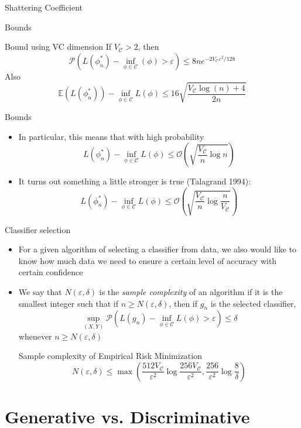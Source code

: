 \documentclass{beamer}
\renewcommand{\Pr}[1]{\mathcal{P} \left( #1 \right)}
\newcommand{\cls}{\mathcal{C}}
\newcommand{\E}[1]{\mathbb{E}\left( #1 \right)}
\newcommand{\pa}[1]{\left( #1 \right)}
\newcommand{\eps}{\varepsilon}
\begin{document}
\begin{frame}{Shattering Coefficient}
\begin{frame}{Bounds}
\begin{block}{Bound using VC dimension}
If $V_\cls > 2$, then
\[ \Pr{ L(\phi^*_n) - \inf_{\phi \in \cls} (\phi) > \eps } \leq 8 ne^{-2V_\cls \eps^2/128} \]
Also
\[ \E{L(\phi^*_n)} - \inf_{\phi\in\cls} L(\phi) \leq 16 \sqrt{\frac{V_\cls \log(n) + 4}{2n}} \]
\end{block}
\end{frame}

\begin{frame}{Bounds}
\begin{itemize}
\item In particular, this means that with high probability
\[ L(\phi^*_n) - \inf_{\phi\in\cls} L(\phi) \leq \mathcal{O}\pa{\sqrt{\frac{V_\cls}{n} \log n }} \]
\item It turns out something a little stronger is true (Talagrand 1994):
\[ L(\phi^*_n) - \inf_{\phi\in\cls} L(\phi) \leq \mathcal{O}\pa{\sqrt{\frac{V_\cls}{n} \log\frac{n}{V_\cls}}} \]
\end{itemize}
\end{frame}


\begin{frame}{Classifier selection}
\begin{itemize}
\item For a given algorithm of selecting a classifier from data, we also would like to know how much data we need to ensure a certain level of accuracy with certain confidence
\item We say that $N(\eps,\delta)$ is the \emph{sample complexity} of an algorithm if it is the smallest integer such that if $n \geq N(\eps,\delta)$, then if $g_n$ is the selected classifier,
\[ \sup_{(X,Y)} \Pr{ L(g_n) - \inf_{\phi \in \cls} L(\phi) > \eps} \leq \delta \]
whenever $n \geq N(\eps,\delta)$
\begin{block}{Sample complexity of Empirical Risk Minimization}
\[ N(\eps, \delta) \leq \max\pa{ \frac{512 V_\cls}{\eps^2} \log\frac{256V_\cls}{\eps^2}, \frac{256}{\eps^2}\log\frac8\delta}\]
\end{block}
\end{itemize}
\end{frame}

\section{Generative vs. Discriminative}

\end{frame}
\end{document}

